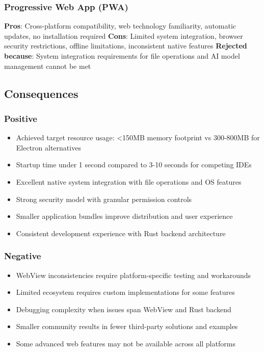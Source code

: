 \subsubsection*{Progressive Web App (PWA)}
\textbf{Pros}: Cross-platform compatibility, web technology familiarity, automatic updates, no installation required
\textbf{Cons}: Limited system integration, browser security restrictions, offline limitations, inconsistent native features
\textbf{Rejected because}: System integration requirements for file operations and AI model management cannot be met

\subsection*{Consequences}

\subsubsection*{Positive}
\begin{itemize}
\item Achieved target resource usage: <150MB memory footprint vs 300-800MB for Electron alternatives
\item Startup time under 1 second compared to 3-10 seconds for competing IDEs
\item Excellent native system integration with file operations and OS features
\item Strong security model with granular permission controls
\item Smaller application bundles improve distribution and user experience
\item Consistent development experience with Rust backend architecture
\end{itemize}

\subsubsection*{Negative}
\begin{itemize}
\item WebView inconsistencies require platform-specific testing and workarounds
\item Limited ecosystem requires custom implementations for some features
\item Debugging complexity when issues span WebView and Rust backend
\item Smaller community results in fewer third-party solutions and examples
\item Some advanced web features may not be available across all platforms
\end{itemize}


